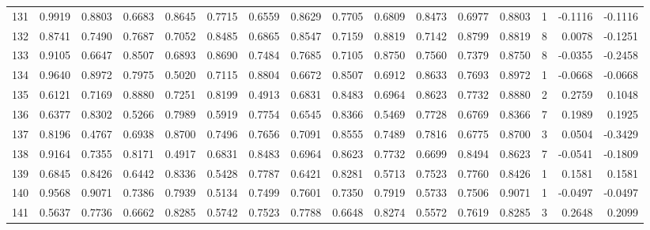 \begin{tabular}{lrrrrrrrrrrrrrrr}
131 &      0.9919 &  0.8803 &  0.6683 &  0.8645 &  0.7715 &  0.6559 &  0.8629 &  0.7705 &  0.6809 &  0.8473 &   0.6977 &     0.8803 &      1 &                   -0.1116 &                    -0.1116 \\
132 &      0.8741 &  0.7490 &  0.7687 &  0.7052 &  0.8485 &  0.6865 &  0.8547 &  0.7159 &  0.8819 &  0.7142 &   0.8799 &     0.8819 &      8 &                    0.0078 &                    -0.1251 \\
133 &      0.9105 &  0.6647 &  0.8507 &  0.6893 &  0.8690 &  0.7484 &  0.7685 &  0.7105 &  0.8750 &  0.7560 &   0.7379 &     0.8750 &      8 &                   -0.0355 &                    -0.2458 \\
134 &      0.9640 &  0.8972 &  0.7975 &  0.5020 &  0.7115 &  0.8804 &  0.6672 &  0.8507 &  0.6912 &  0.8633 &   0.7693 &     0.8972 &      1 &                   -0.0668 &                    -0.0668 \\
135 &      0.6121 &  0.7169 &  0.8880 &  0.7251 &  0.8199 &  0.4913 &  0.6831 &  0.8483 &  0.6964 &  0.8623 &   0.7732 &     0.8880 &      2 &                    0.2759 &                     0.1048 \\
136 &      0.6377 &  0.8302 &  0.5266 &  0.7989 &  0.5919 &  0.7754 &  0.6545 &  0.8366 &  0.5469 &  0.7728 &   0.6769 &     0.8366 &      7 &                    0.1989 &                     0.1925 \\
137 &      0.8196 &  0.4767 &  0.6938 &  0.8700 &  0.7496 &  0.7656 &  0.7091 &  0.8555 &  0.7489 &  0.7816 &   0.6775 &     0.8700 &      3 &                    0.0504 &                    -0.3429 \\
138 &      0.9164 &  0.7355 &  0.8171 &  0.4917 &  0.6831 &  0.8483 &  0.6964 &  0.8623 &  0.7732 &  0.6699 &   0.8494 &     0.8623 &      7 &                   -0.0541 &                    -0.1809 \\
139 &      0.6845 &  0.8426 &  0.6442 &  0.8336 &  0.5428 &  0.7787 &  0.6421 &  0.8281 &  0.5713 &  0.7523 &   0.7760 &     0.8426 &      1 &                    0.1581 &                     0.1581 \\
140 &      0.9568 &  0.9071 &  0.7386 &  0.7939 &  0.5134 &  0.7499 &  0.7601 &  0.7350 &  0.7919 &  0.5733 &   0.7506 &     0.9071 &      1 &                   -0.0497 &                    -0.0497 \\
141 &      0.5637 &  0.7736 &  0.6662 &  0.8285 &  0.5742 &  0.7523 &  0.7788 &  0.6648 &  0.8274 &  0.5572 &   0.7619 &     0.8285 &      3 &                    0.2648 &                     0.2099 \\

\end{tabular}
